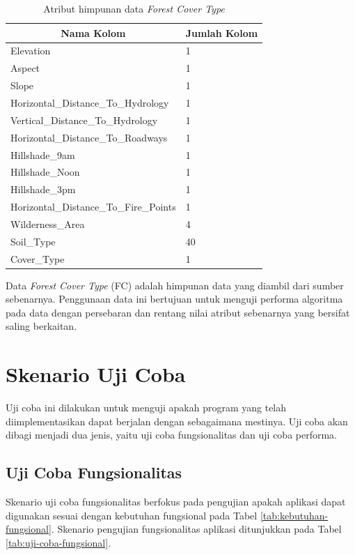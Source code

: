\begin{table}[H]
	\centering
	\begin{tabular}{ | p{6cm} | p{1cm} | }
		\hline
		\multicolumn{1}{|c}{\textbf{Nama Kolom}} & \multicolumn{1}{|c|}{\textbf{Jumlah Kolom}} \\ \hline \hline
		Elevation & 1 \\ \hline
		Aspect & 1 \\ \hline
		Slope & 1  \\ \hline
		Horizontal\_Distance\_To\_Hydrology & 1 \\ \hline 
		Vertical\_Distance\_To\_Hydrology & 1 \\ \hline 
		Horizontal\_Distance\_To\_Roadways & 1 \\ \hline
		Hillshade\_9am & 1 \\ \hline
		Hillshade\_Noon & 1 \\ \hline
		Hillshade\_3pm & 1 \\ \hline
		Horizontal\_Distance\_To\_Fire\_Points & 1 \\ \hline
		Wilderness\_Area & 4 \\ \hline
		Soil\_Type & 40 \\ \hline
		Cover\_Type & 1 \\ \hline
	\end{tabular} \caption{Atribut himpunan data \textit{Forest Cover Type}}
	\label{tab:atribut-fc}
\end{table}

Data \textit{Forest Cover Type} (FC) adalah himpunan data yang
diambil dari sumber sebenarnya. Penggunaan data ini bertujuan
untuk menguji performa algoritma pada data dengan persebaran
dan rentang nilai atribut sebenarnya yang bersifat saling berkaitan.

\pagebreak
\section{Skenario Uji Coba} \label{skenarioujicoba}
\tab Uji coba ini dilakukan untuk menguji apakah program yang telah diimplementasikan dapat berjalan dengan sebagaimana mestinya. Uji coba akan dibagi menjadi dua jenis, yaitu uji coba fungsionalitas dan uji coba performa.

\subsection{Uji Coba Fungsionalitas}
\tab Skenario uji coba fungsionalitas berfokus pada pengujian apakah aplikasi dapat digunakan sesuai dengan kebutuhan fungsional pada Tabel \ref{tab:kebutuhan-fungsional}. Skenario pengujian fungsionalitas aplikasi ditunjukkan pada Tabel \ref{tab:uji-coba-fungsional}.

